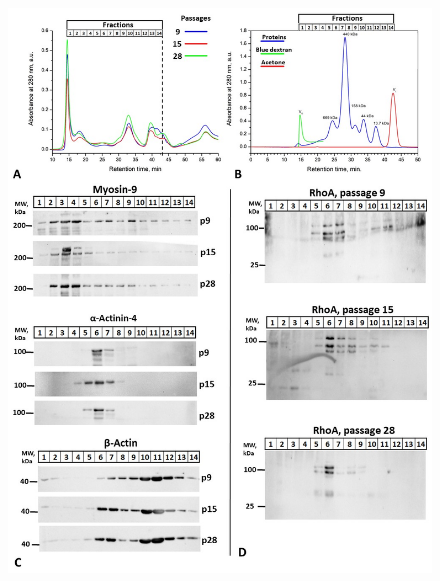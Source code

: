 \documentclass[alpha-refs]{wiley-article}
\begin{document}
\begin{figure}[hbt!]
\centering
\includegraphics[width=1\linewidth]{fplc.jpg}
\caption{}
\end{figure}

\end{document}
